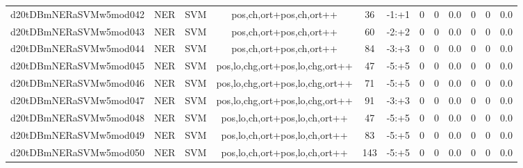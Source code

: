\documentclass[a4paper]{article}
\begin{document}
\begin{landscape}
\begin{center}
\begin{tabular}{ |c|c|c|c|c|c|c|c|c|c|c|c|}
 
 	
 	\small{ d20tDBmNERaSVMw5mod042 } & \small{ NER} & \small{  SVM }  & pos,ch,ort+pos,ch,ort++  &  36 &  \small{  -1:+1 }  &  0 & 0 & 0.0  &  0 & 0 & 0.0 \\
 	

 
 	
 	\small{ d20tDBmNERaSVMw5mod043 } & \small{ NER} & \small{  SVM }  & pos,ch,ort+pos,ch,ort++  &  60 &  \small{  -2:+2 }  &  0 & 0 & 0.0  &  0 & 0 & 0.0 \\
 	

 
 	
 	\small{ d20tDBmNERaSVMw5mod044 } & \small{ NER} & \small{  SVM }  & pos,ch,ort+pos,ch,ort++  &  84 &  \small{  -3:+3 }  &  0 & 0 & 0.0  &  0 & 0 & 0.0 \\
 	

 
 	
 	\small{ d20tDBmNERaSVMw5mod045 } & \small{ NER} & \small{  SVM }  & pos,lo,chg,ort+pos,lo,chg,ort++  &  47 &  \small{  -5:+5 }  &  0 & 0 & 0.0  &  0 & 0 & 0.0 \\
 	

 
 	
 	\small{ d20tDBmNERaSVMw5mod046 } & \small{ NER} & \small{  SVM }  & pos,lo,chg,ort+pos,lo,chg,ort++  &  71 &  \small{  -5:+5 }  &  0 & 0 & 0.0  &  0 & 0 & 0.0 \\
 	

 
 	
 	\small{ d20tDBmNERaSVMw5mod047 } & \small{ NER} & \small{  SVM }  & pos,lo,chg,ort+pos,lo,chg,ort++  &  91 &  \small{  -3:+3 }  &  0 & 0 & 0.0  &  0 & 0 & 0.0 \\
 	

 
 	
 	\small{ d20tDBmNERaSVMw5mod048 } & \small{ NER} & \small{  SVM }  & pos,lo,ch,ort+pos,lo,ch,ort++  &  47 &  \small{  -5:+5 }  &  0 & 0 & 0.0  &  0 & 0 & 0.0 \\
 	

 
 	
 	\small{ d20tDBmNERaSVMw5mod049 } & \small{ NER} & \small{  SVM }  & pos,lo,ch,ort+pos,lo,ch,ort++  &  83 &  \small{  -5:+5 }  &  0 & 0 & 0.0  &  0 & 0 & 0.0 \\
 	

 
 	
 	\small{ d20tDBmNERaSVMw5mod050 } & \small{ NER} & \small{  SVM }  & pos,lo,ch,ort+pos,lo,ch,ort++  &  143 &  \small{  -5:+5 }  &  0 & 0 & 0.0  &  0 & 0 & 0.0 \\
 	


\end{tabular}
\end{center}
\end{landscape}
\end{document}
